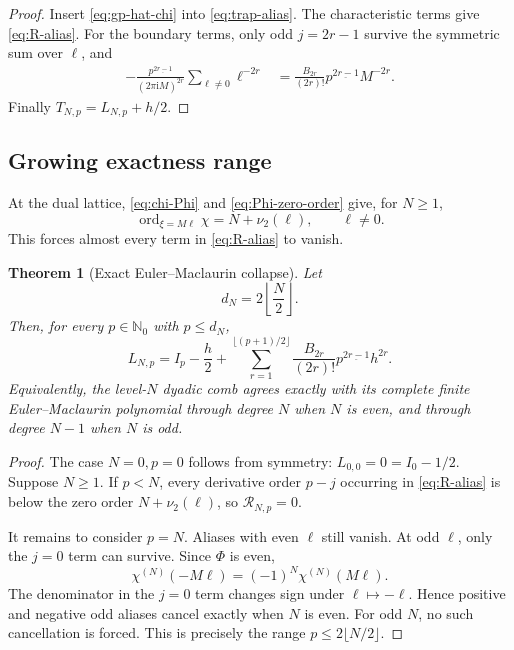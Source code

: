 \documentclass[11pt,oneside]{article}
\numberwithin{equation}{section}
\newtheorem{theorem}{Theorem}[section]
\theoremstyle{definition}
\theoremstyle{remark}
\newcommand{\N}{\mathbb N}
\newcommand{\ii}{\mathrm i}
\newcommand{\vtwo}{\nu_2}
\newcommand{\fall}[2]{#1^{\underline{#2}}}
\newcommand{\defect}{\mathcal R}
\begin{document}
\begin{proof}
Insert \eqref{eq:gp-hat-chi} into \eqref{eq:trap-alias}.  The characteristic terms give
\eqref{eq:R-alias}.  For the boundary terms, only odd \(j=2r-1\) survive the symmetric
sum over \(\ell\), and
\begin{align*}
 -\frac{\fall p{2r-1}}{(2\pi\ii M)^{2r}}
 \sum_{\ell\ne0}\ell^{-2r}
 &=\frac{B_{2r}}{(2r)!}\fall p{2r-1}M^{-2r}.
\end{align*}
Finally \(T_{N,p}=L_{N,p}+h/2\).
\end{proof}

\subsection{Growing exactness range}

At the dual lattice, \eqref{eq:chi-Phi} and \eqref{eq:Phi-zero-order} give, for
\(N\ge1\),
\begin{equation}
 \operatorname{ord}_{\xi=M\ell}\chi
 =N+\vtwo(\ell),
 \qquad \ell\ne0.
 \label{eq:chi-zero-order}
\end{equation}
This forces almost every term in \eqref{eq:R-alias} to vanish.

\begin{theorem}[Exact Euler--Maclaurin collapse]
\label{thm:EM-collapse}
Let
\begin{equation}
 d_N=2\left\lfloor\frac N2\right\rfloor.
 \label{eq:dN}
\end{equation}
Then, for every \(p\in\N_0\) with \(p\le d_N\),
\begin{equation}
 \boxed{\displaystyle
 L_{N,p}=I_p-\frac h2+
 \sum_{r=1}^{\lfloor(p+1)/2\rfloor}
 \frac{B_{2r}}{(2r)!}\fall p{2r-1}h^{2r}.}
 \label{eq:EM-collapse}
\end{equation}
Equivalently, the level-\(N\) dyadic comb agrees exactly with its complete finite
Euler--Maclaurin polynomial through degree \(N\) when \(N\) is even, and through degree
\(N-1\) when \(N\) is odd.
\end{theorem}

\begin{proof}
The case \(N=0,p=0\) follows from symmetry:
\(L_{0,0}=0=I_0-1/2\).  Suppose \(N\ge1\).  If \(p<N\), every derivative order
\(p-j\) occurring in \eqref{eq:R-alias} is below the zero order
\(N+\nu_2(\ell)\), so \(\defect_{N,p}=0\).

It remains to consider \(p=N\).  Aliases with even \(\ell\) still vanish.  At odd
\(\ell\), only the \(j=0\) term can survive.  Since \(\Phi\) is even,
\[
 \chi^{(N)}(-M\ell)=(-1)^N\chi^{(N)}(M\ell).
\]
The denominator in the \(j=0\) term changes sign under \(\ell\mapsto-\ell\).  Hence
positive and negative odd aliases cancel exactly when \(N\) is even.  For odd \(N\), no
such cancellation is forced.  This is precisely the range \(p\le2\lfloor N/2\rfloor\).
\end{proof}
\end{document}
